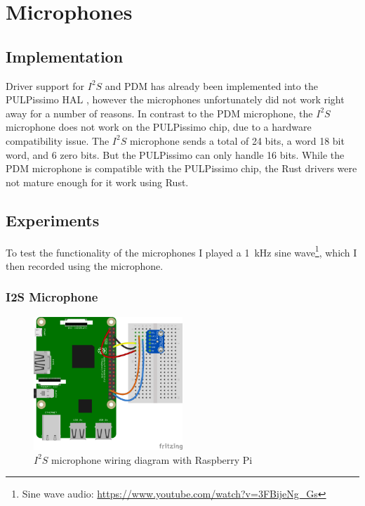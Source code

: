 

\section{Microphones}

\subsection{Implementation}

Driver support for $I^2S$ and PDM has already been implemented into the PULPissimo HAL \cite[Cha 4.3.7]{rust_pulp},
however the microphones unfortunately did not work right away for a number of reasons.
In contrast to the PDM microphone, the $I^2S$ microphone does not work on the PULPissimo chip, due to a hardware compatibility issue.
The $I^2S$ microphone sends a total of 24 bits, a word 18 bit word, and 6 zero bits. But the PULPissimo can only handle 16 bits.
While the PDM microphone is compatible with the PULPissimo chip, the Rust drivers were not mature enough for it work using Rust.

\subsection{Experiments}

To test the functionality of the microphones I played a \SI{1}{\kilo\hertz} sine wave\footnote{Sine wave audio: \url{https://www.youtube.com/watch?v=3FBijeNg_Gs}},
which I then recorded using the microphone.

\subsubsection{I2S Microphone}

\begin{figure}[H]
    \centering
    \includegraphics[width=0.5\textwidth]{figures/i2s/wiring_pi.png}
    \caption[$I^2S$ microphone wiring diagram with Raspberry Pi \cite{i2s_wiring}]{$I^2S$ microphone wiring diagram with Raspberry Pi}
    \label{fig:i2s_wiring}
\end{figure}

